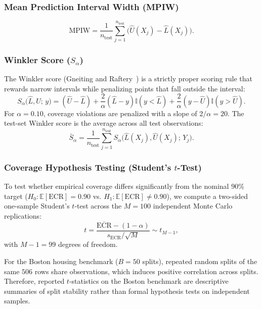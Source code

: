 \documentclass[journal]{IEEEtran}
\begin{document}
\subsubsection{Mean Prediction Interval Width (MPIW)}
\begin{equation}
\text{MPIW} = \frac{1}{n_{\text{test}}} \sum_{j=1}^{n_{\text{test}}} \Big(\hat{U}(X_j) - \hat{L}(X_j)\Big).
\end{equation}

\subsubsection{Winkler Score ($S_\alpha$)}
The Winkler score (Gneiting and Raftery~\cite{gneiting2007}) is a strictly proper scoring rule that rewards narrow intervals while penalizing points that fall outside the interval:
\begin{equation}
S_\alpha\big(\hat{L}, \hat{U}; \, y\big) = (\hat{U} - \hat{L}) + \frac{2}{\alpha}(\hat{L} - y)\mathbb{I}(y < \hat{L}) + \frac{2}{\alpha}(y - \hat{U})\mathbb{I}(y > \hat{U}).
\end{equation}
For $\alpha = 0.10$, coverage violations are penalized with a slope of $2/\alpha = 20$. The test-set Winkler score is the average across all test observations:
\begin{equation}
\bar{S}_\alpha = \frac{1}{n_{\text{test}}} \sum_{j=1}^{n_{\text{test}}} S_\alpha\big(\hat{L}(X_j), \hat{U}(X_j); \, Y_j\big).
\end{equation}

\subsubsection{Coverage Hypothesis Testing (Student's $t$-Test)}
To test whether empirical coverage differs significantly from the nominal $90\%$ target ($H_0: \mathbb{E}[\text{ECR}] = 0.90$ vs. $H_1: \mathbb{E}[\text{ECR}] \ne 0.90$), we compute a two-sided one-sample Student's $t$-test across the $M = 100$ independent Monte Carlo replications:
\begin{equation}
t = \frac{\overline{\text{ECR}} - (1 - \alpha)}{s_{\text{ECR}} / \sqrt{M}} \sim t_{M-1},
\end{equation}
with $M - 1 = 99$ degrees of freedom.

For the Boston housing benchmark ($B = 50$ splits), repeated random splits of the same $506$ rows share observations, which induces positive correlation across splits. Therefore, reported $t$-statistics on the Boston benchmark are descriptive summaries of split stability rather than formal hypothesis tests on independent samples.
\end{document}
